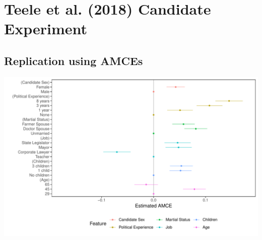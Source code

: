 \documentclass[a4paper,12pt]{article}\usepackage[]{graphicx}\usepackage[]{color}
\makeatletter
\def\maxwidth{ %
  \ifdim\Gin@nat@width>\linewidth
    \linewidth
  \else
    \Gin@nat@width
  \fi
}
\newenvironment{knitrout}{}{} %
\makeatother
\begin{document}
\clearpage








\section{Teele et al. (2018) Candidate Experiment}

\subsection{Replication using AMCEs}

\begin{knitrout}
\color{fgcolor}
\includegraphics[width=\maxwidth]{figure/tkr_amce_appendix-1} 

\end{knitrout}

\clearpage
\end{document}

